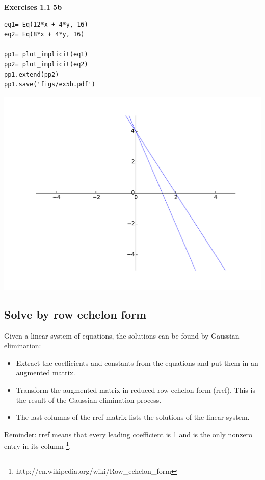 \textbf{Exercises 1.1 5b}

\begin{verbatim}
eq1= Eq(12*x + 4*y, 16)
eq2= Eq(8*x + 4*y, 16)

pp1= plot_implicit(eq1)
pp2= plot_implicit(eq2)
pp1.extend(pp2)
pp1.save('figs/ex5b.pdf')
\end{verbatim}

\includegraphics[width=\linewidth]{figs/ex5b.pdf}

\subsection{Solve by row echelon form}

Given a linear system of equations, the solutions can be found by Gaussian
elimination:

\begin{itemize}
\item Extract the coefficients and constants from the equations and put them in
an augmented matrix.
\item Transform the augmented matrix in reduced row echelon form (rref). This is
the result of the Gaussian elimination process.
\item The last columns of the rref matrix lists the solutions of the linear system.
\end{itemize}

Reminder: rref means that every leading coefficient is 1 and is the only nonzero
entry in its column \footnote{http://en.wikipedia.org/wiki/Row\_echelon\_form}. 

